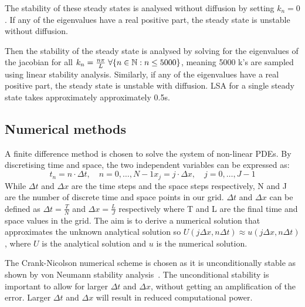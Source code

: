 The stability of these steady states is analysed without diffusion by setting $k_{n}=0$.
If any of the eigenvalues have a real positive part, the steady state is unstable without diffusion.

Then the stability of the steady state is analysed by solving for the eigenvalues of the jacobian for all $k_{n}=\frac{n\pi}{L} \hspace{0.1cm}\forall \{n \in \mathbb{N} : n \leq 5000\} $, meaning 5000 k's are sampled using linear stability analysis. Similarly, if any of the eigenvalues have a real positive part, the steady state is unstable with diffusion. LSA for a single steady state takes approximately approximately 0.5s.

\subsection*{Numerical methods}
A finite difference method is chosen to solve the system of non-linear PDEs. By discretising time and space, the two independent variables can be expressed as:
\begin{subequations}
    \begin{equation}
        t_{n} = n \cdot \Delta t, \quad n=0,\dots,N-1
    \end{equation}
    \begin{equation}
        x_{j} = j \cdot \Delta x, \quad j=0, \dots,J-1
    \end{equation}
\end{subequations}
While $\Delta t$ and $\Delta x$ are the time steps and the space steps respectively, N and J are the number of discrete time and space points in our grid.
$\Delta t$ and $\Delta x$ can be defined as $ \Delta t = \frac{T}{N}$ and $\Delta x= \frac{L}{J}$ respectively where T and L are the final time and space values in the grid.
The aim is to derive a numerical solution that approximates the unknown analytical solution so $U(j\Delta x, n\Delta t)\approx u( j\Delta x, n\Delta t)$, where $U$ is the analytical solution and $u$ is the numerical solution.

The Crank-Nicolson numerical scheme is chosen as it is unconditionally stable as shown by von Neumann stability analysis~\parencite{strikwerda2004finite}.
The unconditional stability is important to allow for larger $\Delta t$ and $\Delta x$, without getting an amplification of the error.
Larger $\Delta t$ and $\Delta x$ will result in reduced computational power.


